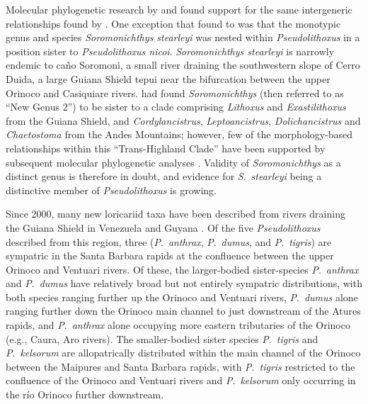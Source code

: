 \documentclass[12pt]{article}
\begin{document}
Molecular phylogenetic research by \citet{Covain2012} and \citet{Lujan2015phylo} found support for the same intergeneric relationships found by \citet{Armbruster2008}. %
One exception that \citet{Lujan2015phylo} found to \citet{Armbruster2008} was that the monotypic genus and species \emph{Soromonichthys stearleyi} \citet{Lujan2011sorom} was nested within \emph{Pseudolithoxus} in a position sister to \emph{Pseudolithoxus nicoi}. %
\emph{Soromonichthys stearleyi} is narrowly endemic to caño Soromoni, a small river draining the southwestern slope of Cerro Duida, a large Guiana Shield tepui near the bifurcation between the upper Orinoco and Casiquiare rivers. %
\citet{Armbruster2008} had found \emph{Soromonichthys} (then referred to as ``New Genus 2'') to be sister to a clade comprising \emph{Lithoxus} and \emph{Exastilithoxus} from the Guiana Shield, and \emph{Cordylancistrus}, \emph{Leptoancistrus}, \emph{Dolichancistrus} and \emph{Chaetostoma} from the Andes Mountains; however, few of the morphology-based relationships within this ``Trans-Highland Clade'' \citep[sensu][]{Lujan2011book,Lujan2011sorom} have been supported by subsequent molecular phylogenetic analyses \citep{Lujan2015phylo,Lujan2015chaeto}. %
Validity of \emph{Soromonichthys} as a distinct genus is therefore in doubt, and evidence for \emph{S}.\ \emph{stearleyi} being a distinctive member of \emph{Pseudolithoxus} is growing.%

Since 2000, many new loricariid taxa have been described from rivers draining the Guiana Shield in Venezuela and Guyana \citep{Armbruster2004,Armbruster2008pseud,Lujan2011sorom,Lujan2009}. %
 Of the five \emph{Pseudolithoxus} described from this region, three (\emph{P}.\ \emph{anthrax}, \emph{P}.\ \emph{dumus}, and \emph{P}.\ \emph{tigris}) are sympatric in the Santa Barbara rapids at the confluence between the upper Orinoco and Ventuari rivers. %
 Of these, the larger-bodied sister-species \emph{P}.\ \emph{anthrax} and \emph{P}.\ \emph{dumus} have relatively broad but not entirely sympatric distributions, with both species ranging further up the Orinoco and Ventuari rivers, \emph{P}.\ \emph{dumus} alone ranging further down the Orinoco main channel to just downstream of the Atures rapids, and \emph{P}.\ \emph{anthrax} alone occupying more eastern tributaries of the Orinoco (e.g., Caura, Aro rivers). %
 The smaller-bodied sister species \emph{P}.\ \emph{tigris} and \emph{P}.\ \emph{kelsorum} are allopatrically distributed within the main channel of the Orinoco between the Maipures and Santa Barbara rapids, with \emph{P}.\ \emph{tigris} restricted to the confluence of the Orinoco and Ventuari rivers and \emph{P}.\ \emph{kelsorum} only occurring in the río Orinoco further downstream.%
 
\end{document}

